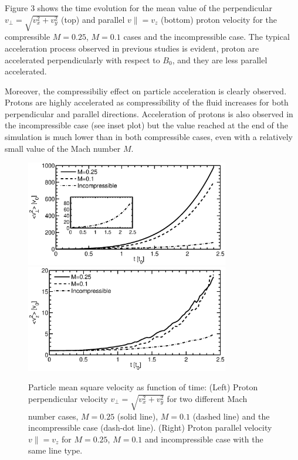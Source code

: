 \documentclass[%
aip,pop,amsmath,amssymb,
 reprint,%
]{revtex4-1}
\begin{document}
Figure 3 shows the time evolution for the mean value of
the perpendicular $v_\perp=\sqrt{v_x^2+v_y^2}$ 
(top) and parallel $v\parallel=v_z$ (bottom) proton velocity 
for the compressible $M=0.25$, $M=0.1$ cases
and the incompressible case. 
The typical acceleration process observed in previous studies is
evident, proton are accelerated perpendicularly with respect to $B_0$, 
and they are less
parallel accelerated. 

Moreover, the compressibiliy effect on particle acceleration 
is clearly observed.
Protons are highly accelerated as compressibility of the fluid increases 
for both perpendicular and parallel directions.
Acceleration of protons is also observed in the 
incompressible case (see inset plot) but
the value reached at the end of the simulation is much lower than in both
compressible cases, even with a relatively small value of the 
Mach number $M$.

\begin{figure}[h!]
\begin{center}
{\includegraphics[width = 3.5in]{./Figures/Fig3_a}}
{\includegraphics[width = 3.5in]{./Figures/Fig3_b}}
\caption{Particle mean square velocity as function of time: (Left)
Proton perpendicular velocity $v_\perp = \sqrt{v_x^2 + v_y^2}$ 
for two different Mach number
cases, $M=0.25$ (solid line), $M=0.1$ (dashed line) and the
incompressible case (dash-dot line). 
(Right) Proton parallel velocity $v\parallel=v_z$ for $M=0.25$, $M=0.1$ 
and incompressible case with the
same line type.}
\end{center}
\label{mean square velocity}
\end{figure}
\end{document}

